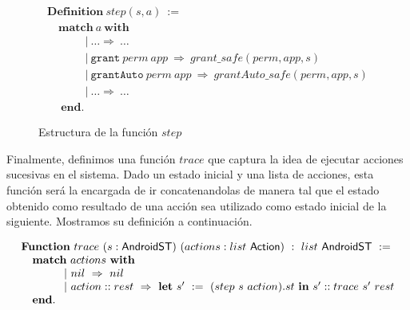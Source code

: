 \begin{figure}[ht]
    \begin{displaymath}
        \begin{array}{l}
            \textbf{Definition}\ step(s,a)\ :=\                                                               \\
            \quad \textbf{match}\ a\ \textbf{with}                                                            \\
            \quad  \hspace{1cm} |\ \ldots \Rightarrow\ \ldots                                                 \\
            \quad  \hspace{1cm} |\  \texttt{grant}\ perm\ app\ \Rightarrow\ grant\_safe(perm, app, s)         \\
            \quad  \hspace{1cm} |\  \texttt{grantAuto}\ perm\ app\ \Rightarrow\ grantAuto\_safe(perm, app, s) \\
            \quad  \hspace{1cm} |\ \ldots \Rightarrow\ \ldots                                                 \\
            \quad\ \textbf{end}.
        \end{array}
    \end{displaymath}
    \caption{Estructura de la función $step$}
    \label{fig:step}
\end{figure}

Finalmente, definimos una función $trace$ que captura la idea de ejecutar acciones sucesivas en el
sistema. Dado un estado inicial y una lista de acciones, esta función será la encargada de ir
concatenandolas de manera tal que el estado obtenido como resultado de una acción sea utilizado como
estado inicial de la siguiente. Mostramos su definición a continuación.

\begin{displaymath}
    \begin{array}{l}
        \textbf{Function}\ trace\ (s:\AndroidState)\ (actions:list\ \Action)\ :\ list\ \AndroidState \ :=                             \\
        \quad \textbf{match}\ actions\ \textbf{with}                                                                                  \\
        \quad \hspace{1cm} |\ nil\ \Rightarrow\ nil                                                                                   \\
        \quad \hspace{1cm} |\ action::rest\ \Rightarrow\ \textbf{let}\ s'\ :=\ (step\ s\ action).st\ \textbf{in}\ s'::trace\ s'\ rest \\
        \quad \textbf{end}.
    \end{array}
\end{displaymath}

